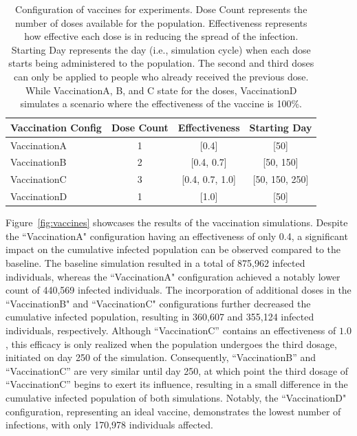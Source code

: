 \documentclass[pdflatex,sn-mathphys-num]{sn-jnl}%
\newcommand\red[1]{#1}
\theoremstyle{thmstyleone}%
\theoremstyle{thmstyletwo}%
\theoremstyle{thmstylethree}%
\begin{document}
\begin{table}[ht]
\centering
\caption{Configuration of vaccines for experiments. Dose Count represents the number of doses available for the population. Effectiveness represents how effective each dose is in reducing the spread of the infection. Starting Day represents the day (i.e., simulation cycle) when each dose starts being administered to the population. The second and third doses can only be applied to people who already received the previous dose. While VaccinationA, B, and C state for the doses, VaccinationD simulates a scenario where the effectiveness of the vaccine is 100\%.}
\label{tbl:vaccine_configuration}
\begin{tabular}{@{}lccc@{}}
\toprule
Vaccination Config & \multicolumn{1}{l}{Dose Count} & Effectiveness  & Starting Day  \\ \midrule
VaccinationA       & 1                              & {[}0.4{]}           & {[}50{]}           \\
VaccinationB       & 2                              & {[}0.4, 0.7{]}      & {[}50, 150{]}      \\
VaccinationC       & 3                              & {[}0.4, 0.7, 1.0{]} & {[}50, 150, 250{]} \\
VaccinationD       & 1                              & {[}1.0{]}           & {[}50{]}           \\ \bottomrule
\end{tabular}
\end{table}

Figure~\ref{fig:vaccines} showcases the results of the vaccination simulations. Despite the ``VaccinationA" configuration having an effectiveness of only 0.4, a significant impact on the cumulative infected population can be observed compared to the baseline. The baseline simulation resulted in a total of 875,962 infected individuals, whereas the ``VaccinationA" configuration achieved a notably lower count of 440,569 infected individuals. The incorporation of additional doses in the ``VaccinationB" and ``VaccinationC" configurations further decreased the cumulative infected population, resulting in 360,607 and 355,124 infected individuals, respectively. 
Although ``VaccinationC'' contains an effectiveness of $1.0$, this efficacy is only realized when the population undergoes the third dosage, initiated on day 250 of the simulation. Consequently, ``VaccinationB'' and ``VaccinationC'' are very similar until day 250, at which point the third dosage of ``VaccinationC'' begins to exert its influence, resulting in a small difference in the cumulative infected population of both simulations.
\red{Notably, the ``VaccinationD" configuration, representing an ideal vaccine, demonstrates the lowest number of infections, with only 170,978 individuals affected.}
\end{document}
